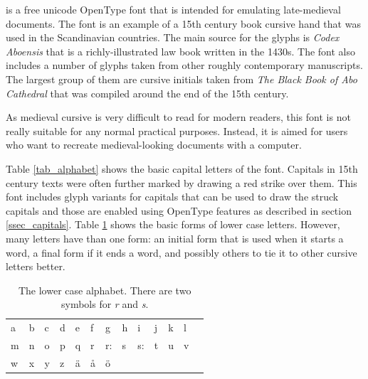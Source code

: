 \documentclass[a4paper]{article}
\newcommand{\lettersample}[1]{{\fontsize{18}{18}\fontspec[RawFeature=-calt;]{Aboensis}#1}}
\begin{document}
\Aboensis{} is a free unicode OpenType font that is intended for
emulating late-medieval documents. The font is an example of a 15th
century book cursive hand that was used in the Scandinavian countries.
The main source for the glyphs is \emph{Codex Aboensis} that is a
richly-illustrated law book written in the 1430s. The font also
includes a number of glyphs taken from other roughly contemporary
manuscripts. The largest group of them are cursive initials taken from
\emph{The Black Book of Abo Cathedral} that was compiled around the
end of the 15th century.

As medieval cursive is very difficult to read for modern readers, this
font is not really suitable for any normal practical purposes.
Instead, it is aimed for users who want to recreate medieval-looking
documents with a computer.

Table \ref{tab_alphabet} shows the basic capital letters of the font.
Capitals in 15th century texts were often further marked by drawing a
red strike over them. This font includes glyph variants for capitals
that can be used to draw the struck capitals and those are enabled
using OpenType features as described in section \ref{ssec_capitals}.
Table \ref{tab_lower_case} shows the basic forms of lower case
letters. However, many letters have than one form: an initial form
that is used when it starts a word, a final form if it ends a word,
and possibly others to tie it to other cursive letters better. 

\begin{table}
  \centering
\begin{tabular}{lllllllllllll}

    \lettersample{a} & 
    \lettersample{b} & 
    \lettersample{c} & 
    \lettersample{d} & 
    \lettersample{e} & 
    \lettersample{f} & 
    \lettersample{g} & 
    \lettersample{h} & 
    \lettersample{i} & 
    \lettersample{j} &
    \lettersample{k} & 
    \lettersample{l} \\ 
    \lettersample{m} & 
    \lettersample{n} & 
    \lettersample{o} & 
    \lettersample{p} & 
    \lettersample{q} & 
    \lettersample{r} & 
    \lettersample{r:} & 
    \lettersample{s}  &
    \lettersample{s:} & 
    \lettersample{t} &
    \lettersample{u} & 
    \lettersample{v} \\ 
    \lettersample{w} & 
    \lettersample{x} & 
    \lettersample{y} & 
    \lettersample{z} & 
    \lettersample{ä} & 
    \lettersample{å} &
    \lettersample{ö} & 
  \end{tabular}
  \caption{The lower case alphabet. There are two symbols for \emph{r}
  and \emph{s}.}
  \label{tab_lower_case}
\end{table}
\end{document}

